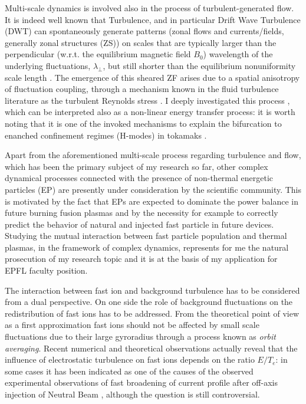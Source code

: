 \documentclass[12pt,a4paper]{article}
\begin{document}
Multi-scale dynamics is involved also in the process of
turbulent-generated flow. It is indeed well known that Turbulence, and
in particular Drift Wave Turbulence (DWT) can spontaneously generate patterns (zonal flows and
currents/fields, generally zonal structures (ZS)) 
on scales that are typically larger than the perpendicular (w.r.t. the
equilibrium magnetic field $B_0$) 
wavelength of the underlying fluctuations, $\lambda_{\perp}$, but
still shorter than the equilibrium nonuniformity scale length
\cite{Hasegawa:1979cp}. 
The emergence of this sheared ZF arises due to a spatial anisotropy of
fluctuation coupling, through a mechanism known in the fluid
turbulence literature as the turbulent Reynolds stress
\cite{Tynan:2009p4426}. I deeply investigated this process \cite{Vianello:2005p1976,Vianello:2006p1149},
which can be interpreted also as a
non-linear energy transfer process: it is worth noting that it is one
of the invoked mechanisms 
to explain the bifurcation to enanched confinement regimes
(H-modes) in tokamaks \cite{Schmitz:2012hwa}. 

Apart from the aforementioned multi-scale process regarding turbulence
and flow, which has been the primary subject of my research so far,
other complex dynamical processes connected with the presence of non-thermal
energetic particles (EP) are presently under consideration by the
scientific community. This is motivated
by the fact that EPs are expected to dominate the power balance in
future burning fusion plasmas \cite{Zonca:2015hs} and by the necessity
for example 
to correctly predict the behavior of natural and injected fast
particle in future devices. Studying the mutual
interaction between fast particle population and thermal plasmas, in
the framework of complex dynamics, 
represents for me the natural prosecution of my research topic and it
is at the basis of my application for EPFL faculty position. 

The interaction between fast ion and background turbulence has to be
considered from a dual perspective. 
On one side the role of background fluctuations on the
redistribution of fast ions has to be addressed. From the theoretical
point of view as a first approximation fast ions should not be
affected by small scale fluctuations due to their large gyroradius
through a process known as \emph{orbit averaging}. Recent numerical and
theoretical observations \cite{Albergante:2011bj} actually reveal
that the influence of electrostatic turbulence on fast ions depends on the ratio
$E/T_e$: in some cases it has been indicated as one of the causes of
the observed experimental observations of fast broadening of current profile after
off-axis injection of Neutral Beam
\cite{Heidbrink:2009wv,Baranov:2009p4033}, although the question is
still controversial.
\end{document}
